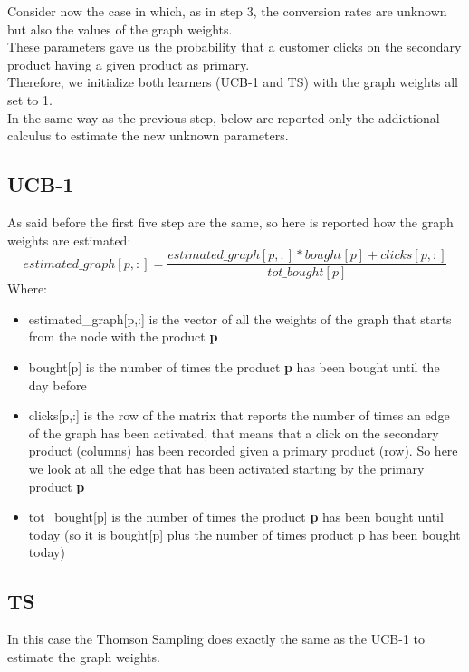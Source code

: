 Consider now the case in which, as in step 3, the conversion rates are unknown but also the values of the graph weights.\\ These parameters gave us the probability that a customer clicks on the secondary product having a given product as primary.\\ Therefore, we initialize both learners (UCB-1 and TS) with the graph weights all set to 1.\\ 
In the same way as the previous step, below are reported only the addictional calculus to estimate the new unknown parameters.

\subsection{UCB-1}
As said before the first five step are the same, so here is reported how the graph weights are estimated:
\begin{equation}
    estimated\_graph[p,:] = \frac{estimated\_graph[p,:] * bought[p] + clicks[p,:]}{tot\_bought[p]}
\end{equation}Where: \begin{itemize}
    \item estimated\_graph[p,:] is the vector of all the weights of the graph that starts from the node with the product {\bf p}
    \item bought[p] is the number of times the product {\bf p} has been bought until the day before
    \item clicks[p,:] is the row of the matrix that reports the number of times an edge of the graph has been activated, that means that a click on the secondary product (columns) has been recorded given a primary product (row). So here we look at all the edge that has been activated starting by the primary product {\bf p}
    \item tot\_bought[p] is the number of times the product {\bf p} has been bought until today (so it is bought[p] plus the number of times product p has been bought today)
\end{itemize}
\subsection{TS}
In this case the Thomson Sampling does exactly the same as the UCB-1 to estimate the graph weights.
